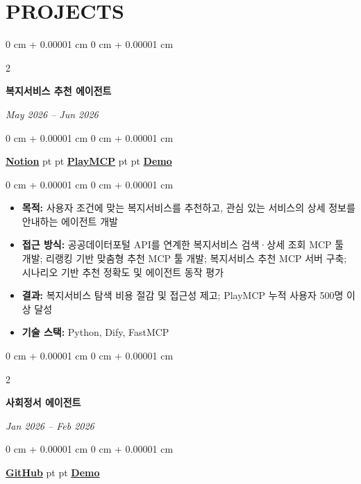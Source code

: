 \documentclass[10pt, letterpaper]{article}
\newenvironment{highlights}{
    \begin{itemize}[
        topsep=0.10 cm,
        parsep=0.10 cm,
        partopsep=0pt,
        itemsep=0pt,
        leftmargin=0 cm + 10pt
    ]
}{
    \end{itemize}
} %
\newenvironment{onecolentry}{
    \begin{adjustwidth}{
        0 cm + 0.00001 cm
    }{
        0 cm + 0.00001 cm
    }
}{
    \end{adjustwidth}
} %
\newenvironment{twocolentry}[2][]{
    \onecolentry
    \def\secondColumn{\textit{#2}}
    \setcolumnwidth{\fill, 4.5 cm}
    \begin{paracol}{2}
}{
    \switchcolumn \raggedleft \secondColumn
    \end{paracol}
    \endonecolentry
} %
\begin{document}
    \vspace{5 pt - 0.3 cm}        
    \section{PROJECTS}
        \begin{twocolentry}{
            May 2026 -- Jun 2026
        }
            \textbf{복지서비스 추천 에이전트}
        \end{twocolentry}
        \begin{onecolentry}
            \href{https://awake-kumquat-803.notion.site/37f74ec8f70380da8ea8e3bfb9c90aeb?source=copy_link}{\textbf{Notion}}
             pt
            \AND
             pt
            \href{https://playmcp.kakao.com/mcp/67434660073905660}{\textbf{PlayMCP}}
             pt
            \AND
             pt
            \href{https://drive.google.com/file/d/1bJwHpEAPL_bmNNOpSlURRJnA-4vfDNOm/view?usp=sharing}{\textbf{Demo}}
        \end{onecolentry}
            
        \vspace{0.10 cm}
        \begin{onecolentry}
            \begin{highlights}
                \item \textbf{목적:} 사용자 조건에 맞는 복지서비스를 추천하고, 관심 있는 서비스의 상세 정보를 안내하는 에이전트 개발
                \item \textbf{접근 방식:} 공공데이터포털 API를 연계한 복지서비스 검색·상세 조회 MCP 툴 개발; 리랭킹 기반 맞춤형 추천 MCP 툴 개발; 복지서비스 추천 MCP 서버 구축; 시나리오 기반 추천 정확도 및 에이전트 동작 평가
                \item \textbf{결과:} 복지서비스 탐색 비용 절감 및 접근성 제고; PlayMCP 누적 사용자 500명 이상 달성
                \item \textbf{기술 스택:} Python, Dify, FastMCP
            \end{highlights}
        \end{onecolentry}

        \vspace{0.2 cm}
        \begin{twocolentry}{
            Jan 2026 -- Feb 2026
        }
            \textbf{사회정서 에이전트}
        \end{twocolentry}
        \begin{onecolentry}
            \href{https://github.com/kyoui-dev/social-emotional-agent}{\textbf{GitHub}}
             pt
            \AND
             pt
            \href{https://drive.google.com/file/d/1SS4lnZZ4xYV0Dn5OcXc2azIR1_l4dUTo/view?usp=sharing}{\textbf{Demo}}
        \end{onecolentry}
            
\end{document}
